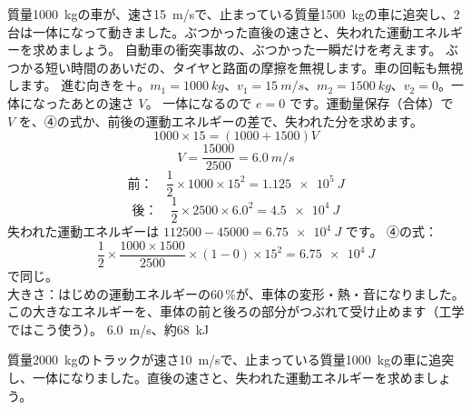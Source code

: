 \label{ph:力-3:ex10}
\begin{phreidai}[車の追突]
質量\qty{1000}{kg}の車が、速さ\qty{15}{m/s}で、止まっている質量\qty{1500}{kg}の車に追突し、2台は一体になって動きました。ぶつかった直後の速さと、失われた運動エネルギーを求めましょう。
\phbamen
自動車の衝突事故の、ぶつかった一瞬だけを考えます。
\phmushi
ぶつかる短い時間のあいだの、タイヤと路面の摩擦を無視します。車の回転も無視します。
\phzu
進む向きを＋。$m_1=\qty{1000}{kg}$、$v_1=\qty{15}{m/s}$、$m_2=\qty{1500}{kg}$、$v_2=0$。一体になったあとの速さ $V$。
\phriyu
一体になるので $e=0$ です。運動量保存（合体）で $V$ を、④の式か、前後の運動エネルギーの差で、失われた分を求めます。
\phtateru
\[1000\times15=(1000+1500)V\]
\phtoku
\[V=\frac{\num{15000}}{2500}=\qty{6.0}{m/s}\]
\[\text{前：}\quad\frac{1}{2}\times1000\times15^2=\qty{1.125e5}{J}\]
\[\text{後：}\quad\frac{1}{2}\times2500\times6.0^2=\qty{4.5e4}{J}\]
失われた運動エネルギーは $\num{112500}-\num{45000}=\qty{6.75e4}{J}$ です。
\phtashikame
④の式：
\[\frac{1}{2}\times\frac{1000\times1500}{2500}\times(1-0)\times15^2=\qty{6.75e4}{J}\]
で同じ。\\
大きさ：はじめの運動エネルギーの60\,\%が、車体の変形・熱・音になりました。この大きなエネルギーを、車体の前と後ろの部分がつぶれて受け止めます（工学ではこう使う）。
\kotae \qty{6.0}{m/s}、約\qty{68}{kJ}
\end{phreidai}
\begin{jibun}
質量\qty{2000}{kg}のトラックが速さ\qty{10}{m/s}で、止まっている質量\qty{1000}{kg}の車に追突し、一体になりました。直後の速さと、失われた運動エネルギーを求めましょう。
\end{jibun}

